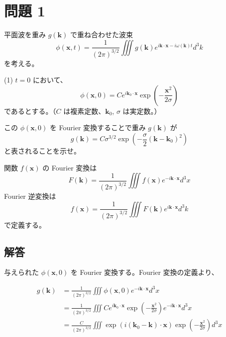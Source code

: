 \documentclass{article}
\begin{document}
\section*{問題 1}

平面波を重み $g(\bm{k})$ で重ね合わせた波束
\begin{equation}
    \phi(\bm{x}, t) = \frac{1}{(2\pi)^{3/2}} \iiint g(\bm{k}) e^{i \bm{k} \cdot \bm{x} - i \omega(\bm{k}) t} d^3 k
\end{equation}
を考える。

(1) $t=0$ において、
\begin{equation}
    \phi(\bm{x}, 0) = C e^{i \bm{k}_0 \cdot \bm{x}} \exp \left( - \frac{\bm{x}^2}{2\sigma} \right)
\end{equation}
であるとする。（$C$ は複素定数、$\bm{k}_0$, $\sigma$ は実定数。）

この $\phi(\bm{x}, 0)$ を Fourier 変換することで重み $g(\bm{k})$ が
\begin{equation}
    g(\bm{k}) = C \sigma^{3/2} \exp \left( - \frac{\sigma}{2} (\bm{k} - \bm{k}_0)^2 \right)
\end{equation}
と表されることを示せ。

関数 $f(\bm{x})$ の Fourier 変換は
\begin{equation}
    F(\bm{k}) = \frac{1}{(2\pi)^{3/2}} \iiint f(\bm{x}) e^{-i \bm{k} \cdot \bm{x}} d^3 x
\end{equation}
Fourier 逆変換は
\begin{equation}
    f(\bm{x}) = \frac{1}{(2\pi)^{3/2}} \iiint F(\bm{k}) e^{i \bm{k} \cdot \bm{x}} d^3 k
\end{equation}
で定義する。

\subsection*{解答}

与えられた $\phi(\bm{x}, 0)$ を Fourier 変換する。Fourier 変換の定義より、

\begin{align}
    g(\bm{k}) &= \frac{1}{(2\pi)^{3/2}} \iiint \phi(\bm{x}, 0) e^{-i \bm{k} \cdot \bm{x}} d^3 x \\
    &= \frac{1}{(2\pi)^{3/2}} \iiint C e^{i \bm{k}_0 \cdot \bm{x}} \exp \left( - \frac{\bm{x}^2}{2\sigma} \right) e^{-i \bm{k} \cdot \bm{x}} d^3 x \\
    &= \frac{C}{(2\pi)^{3/2}} \iiint \exp \left( i (\bm{k}_0 - \bm{k}) \cdot \bm{x} \right) \exp \left( - \frac{\bm{x}^2}{2\sigma} \right) d^3 x
\end{align}
\end{document}
